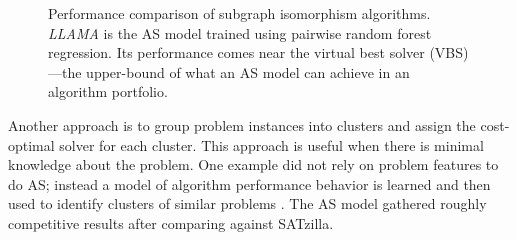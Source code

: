 \begin{figure}[H]
	\centering
	\caption[Performance comparison of subgraph isomorphism algorithms]{ Performance comparison of subgraph isomorphism algorithms. \textit{LLAMA} is the AS model trained using pairwise random forest regression. Its performance comes near the virtual best solver (VBS)—the upper-bound of what an AS model can achieve in an algorithm portfolio. \citep{kotthoff2016portfolios}}
	\label{fig:subgraphisomorphism}
\end{figure}

Another approach is to group problem instances into clusters and assign the cost-optimal solver for each cluster. This approach is useful when there is minimal knowledge about the problem. One example did not rely on problem features to do AS; instead a model of algorithm performance behavior is learned and then used to identify clusters of similar problems \citep{silverthorn2010latent}. The AS model gathered roughly competitive results after comparing against SATzilla.

